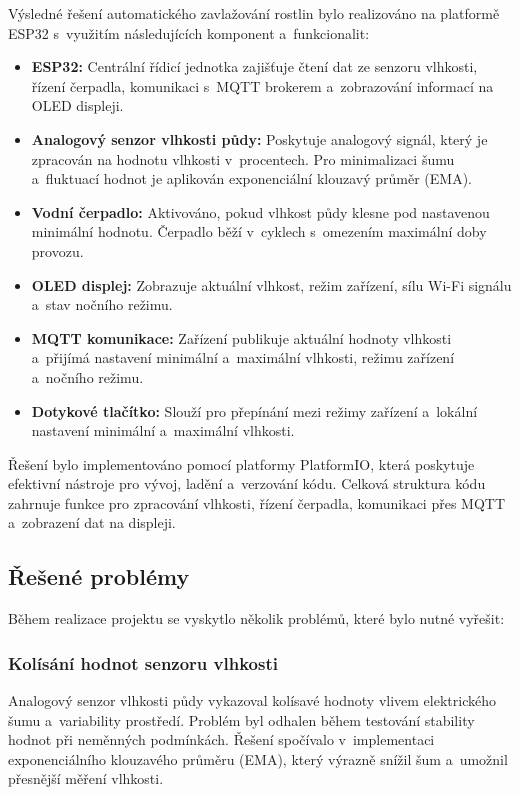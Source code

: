 \documentclass[a4paper, 11pt]{article}
\begin{document}
Výsledné řešení automatického zavlažování rostlin bylo realizováno na platformě ESP32 s~využitím následujících komponent a~funkcionalit:
\begin{itemize}
    \item \textbf{ESP32:} Centrální řídicí jednotka zajišťuje čtení dat ze senzoru vlhkosti, řízení čerpadla, komunikaci s~MQTT brokerem a~zobrazování informací na OLED displeji.
    \item \textbf{Analogový senzor vlhkosti půdy:} Poskytuje analogový signál, který je zpracován na hodnotu vlhkosti v~procentech. Pro minimalizaci šumu a~fluktuací hodnot je aplikován exponenciální klouzavý průměr (EMA).
    \item \textbf{Vodní čerpadlo:} Aktivováno, pokud vlhkost půdy klesne pod nastavenou minimální hodnotu. Čerpadlo běží v~cyklech s~omezením maximální doby provozu.
    \item \textbf{OLED displej:} Zobrazuje aktuální vlhkost, režim zařízení, sílu Wi-Fi signálu a~stav nočního režimu.
    \item \textbf{MQTT komunikace:} Zařízení publikuje aktuální hodnoty vlhkosti a~přijímá nastavení minimální a~maximální vlhkosti, režimu zařízení a~nočního režimu.
    \item \textbf{Dotykové tlačítko:} Slouží pro přepínání mezi režimy zařízení a~lokální nastavení minimální a~maximální vlhkosti.
\end{itemize}

Řešení bylo implementováno pomocí platformy PlatformIO, která poskytuje efektivní nástroje pro vývoj, ladění a~verzování kódu. 
Celková struktura kódu zahrnuje funkce pro zpracování vlhkosti, řízení čerpadla, komunikaci přes MQTT a~zobrazení dat na displeji.

\subsection{Řešené problémy}

Během realizace projektu se vyskytlo několik problémů, které bylo nutné vyřešit:

\subsubsection{Kolísání hodnot senzoru vlhkosti}
Analogový senzor vlhkosti půdy vykazoval kolísavé hodnoty vlivem elektrického šumu a~variability prostředí. 
Problém byl odhalen během testování stability hodnot při neměnných podmínkách. Řešení spočívalo v~implementaci exponenciálního klouzavého průměru (EMA), 
který výrazně snížil šum a~umožnil přesnější měření vlhkosti.
\end{document}
